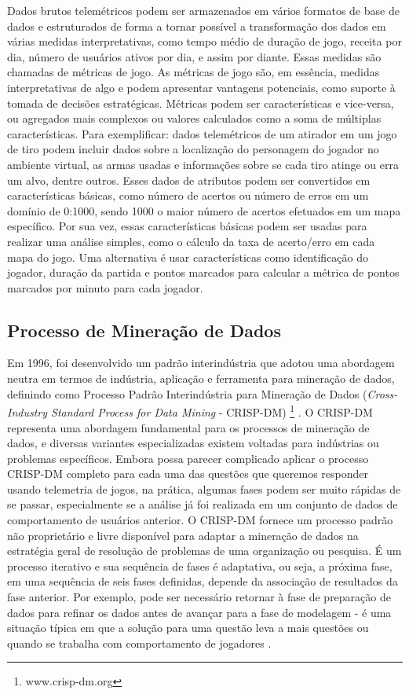 Dados brutos telemétricos podem ser armazenados em vários formatos de base de dados e estruturados de forma a tornar possível a transformação dos dados em várias medidas interpretativas, como tempo médio de duração de jogo, receita por dia, número de usuários ativos por dia, e assim por diante. Essas medidas são chamadas de métricas de jogo. As métricas de jogo são, em essência, medidas interpretativas de algo e podem apresentar vantagens potenciais, como suporte à tomada de decisões estratégicas. Métricas podem ser características e vice-versa, ou agregados mais complexos ou valores calculados como a soma de múltiplas características. Para exemplificar: dados telemétricos de um atirador em um jogo de tiro podem incluir dados sobre a localização do personagem do jogador no ambiente virtual, as armas usadas e informações sobre se cada tiro atinge ou erra um alvo, dentre outros. Esses dados de atributos podem ser convertidos em características básicas, como número de acertos ou número de erros em um domínio de 0:1000, sendo 1000 o maior número de acertos efetuados em um mapa específico. Por sua vez, essas características básicas podem ser usadas para realizar uma análise simples, como o cálculo da taxa de acerto/erro em cada mapa do jogo. Uma alternativa é usar características como identificação do jogador, duração da partida e pontos marcados para calcular a métrica de pontos marcados por minuto para cada jogador.

\subsection{Processo de Mineração de Dados}
Em 1996, foi desenvolvido um padrão interindústria que adotou uma abordagem neutra em termos de indústria, aplicação e ferramenta para mineração de dados, definindo como Processo Padrão Interindústria para Mineração de Dados (\textit{Cross-Industry Standard Process for Data Mining} - CRISP-DM) \footnote{www.crisp-dm.org} \cite{chapman2000crisp}. O CRISP-DM representa uma abordagem fundamental para os processos de mineração de dados, e diversas variantes especializadas existem voltadas para indústrias ou problemas específicos. Embora possa parecer complicado aplicar o processo CRISP-DM completo para cada uma das questões que queremos responder usando telemetria de jogos, na prática, algumas fases podem ser muito rápidas de se passar, especialmente se a análise já foi realizada em um conjunto de dados de comportamento de usuários anterior. O CRISP-DM fornece um processo padrão não proprietário e livre disponível para adaptar a mineração de dados na estratégia geral de resolução de problemas de uma organização ou pesquisa. É um processo iterativo e sua sequência de fases é adaptativa, ou seja, a próxima fase, em uma sequência de seis fases definidas, depende da associação de resultados da fase anterior. Por exemplo, pode ser necessário retornar à fase de preparação de dados para refinar os dados antes de avançar para a fase de modelagem - é uma situação típica em que a solução para uma questão leva a mais questões ou quando se trabalha com comportamento de jogadores \cite{el2016game}.

